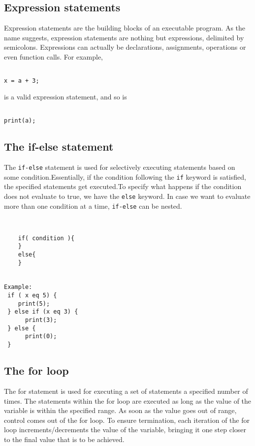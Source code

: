 

\subsection{Expression statements}

Expression statements are the building blocks of an executable program. As the name suggests, expression statements are nothing but expressions, delimited by semicolons. 
Expressions can actually be declarations, assignments, operations or even function calls.
For example,
\begin{lstlisting}

x = a + 3;
\end{lstlisting}
is a valid expression statement, and so is 
\begin{lstlisting}

print(a);
\end{lstlisting}

\subsection{The if-else statement}
The \texttt{if-else} statement is used for selectively executing statements based on some condition.Essentially, if the condition following the \texttt{if} keyword is satisfied, the specified statements get executed.To specify what happens if the condition does not evaluate to true, we have the \texttt{else} keyword.
In case we want to evaluate more than one condition at a time, \texttt{if-else} can be nested.%


\begin{lstlisting}


	if( condition ){
	}
	else{
	}


Example:
 if ( x eq 5) {
    print(5);
 } else if (x eq 3) {
 	  print(3);
 } else {
	  print(0);
 }
\end{lstlisting}

\subsection{The for loop}

The \textsf{for} statement is used for executing a set of statements a specified number of times.	The statements within the for loop are executed as long as the value of the variable is within the specified range. 
As soon as the value goes out of range, control comes out of the \textsf{for} loop. To ensure termination, each iteration of the \textsf{for} loop increments/decrements the value of the variable, bringing it one step closer to the final value that is to be achieved.

